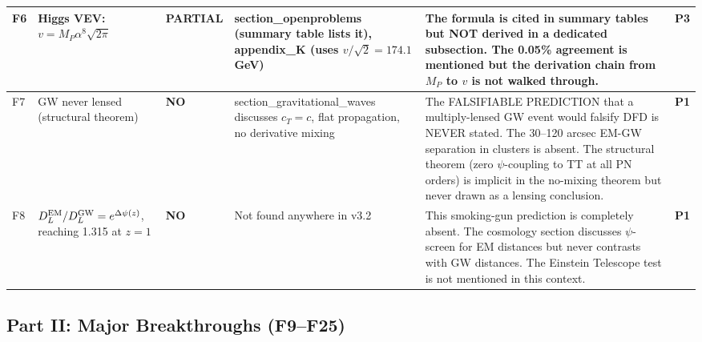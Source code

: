 \documentclass[11pt,a4paper]{article}
\newcommand{\PARTIAL}{\textcolor{partial}{\textbf{PARTIAL}}}
\newcommand{\NO}{\textcolor{no}{\textbf{NO}}}
\begin{document}
\begin{longtable}{|p{0.5cm}|p{3.5cm}|p{1.2cm}|p{3.5cm}|p{4.5cm}|p{1cm}|}
F6 & Higgs VEV: $v = M_P \alpha^8 \sqrt{2\pi}$ &
\PARTIAL &
section\_openproblems (summary table lists it), appendix\_K (uses $v/\sqrt{2} = 174.1$ GeV) &
The formula is cited in summary tables but NOT derived in a dedicated subsection. The 0.05\% agreement is mentioned but the derivation chain from $M_P$ to $v$ is not walked through. &
\textbf{P3} \\
\hline

F7 & GW never lensed (structural theorem) &
\NO &
section\_gravitational\_waves discusses $c_T = c$, flat propagation, no derivative mixing &
The FALSIFIABLE PREDICTION that a multiply-lensed GW event would falsify DFD is NEVER stated. The 30--120 arcsec EM-GW separation in clusters is absent. The structural theorem (zero $\psi$-coupling to TT at all PN orders) is implicit in the no-mixing theorem but never drawn as a lensing conclusion. &
\textcolor{critical}{\textbf{P1}} \\
\hline

F8 & $D_L^{\rm EM}/D_L^{\rm GW} = e^{\Delta\psi(z)}$, reaching 1.315 at $z=1$ &
\NO &
Not found anywhere in v3.2 &
This smoking-gun prediction is completely absent. The cosmology section discusses $\psi$-screen for EM distances but never contrasts with GW distances. The Einstein Telescope test is not mentioned in this context. &
\textcolor{critical}{\textbf{P1}} \\
\hline

\end{longtable}


\subsection{Part II: Major Breakthroughs (F9--F25)}
\end{document}
